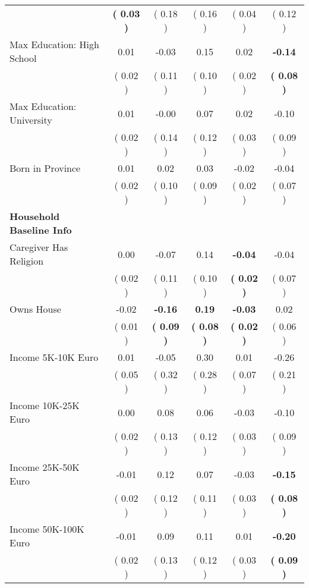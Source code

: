 \begin{table}[H]
{\begin{tabular}{lccccc}
\quad  & \textbf{(     0.03 )} & (     0.18 )  & (     0.16 )  & (     0.04 ) & (     0.12 ) \\
\quad Max Education: High School &      0.01 &     -0.03 &      0.15 &      0.02 & \textbf{    -0.14} \\
\quad  & (     0.02 ) & (     0.11 )  & (     0.10 )  & (     0.02 ) & \textbf{(     0.08 )} \\
\quad Max Education: University &      0.01 &     -0.00 &      0.07 &      0.02 &     -0.10 \\
\quad  & (     0.02 ) & (     0.14 )  & (     0.12 )  & (     0.03 ) & (     0.09 ) \\
\quad Born in Province &      0.01 &      0.02 &      0.03 &     -0.02 &     -0.04 \\
\quad  & (     0.02 ) & (     0.10 )  & (     0.09 )  & (     0.02 ) & (     0.07 ) \\
\midrule
\textbf{Household Baseline Info} \\
\quad Caregiver Has Religion &      0.00 &     -0.07 &      0.14 & \textbf{    -0.04} &     -0.04 \\
\quad  & (     0.02 ) & (     0.11 )  & (     0.10 )  & \textbf{(     0.02 )} & (     0.07 ) \\
\quad Owns House &     -0.02 & \textbf{    -0.16} & \textbf{     0.19} & \textbf{    -0.03} &      0.02 \\
\quad  & (     0.01 ) & \textbf{(     0.09 )}  & \textbf{(     0.08 )}  & \textbf{(     0.02 )} & (     0.06 ) \\
\quad Income 5K-10K Euro &      0.01 &     -0.05 &      0.30 &      0.01 &     -0.26 \\
\quad  & (     0.05 ) & (     0.32 )  & (     0.28 )  & (     0.07 ) & (     0.21 ) \\
\quad Income 10K-25K Euro &      0.00 &      0.08 &      0.06 &     -0.03 &     -0.10 \\
\quad  & (     0.02 ) & (     0.13 )  & (     0.12 )  & (     0.03 ) & (     0.09 ) \\
\quad Income 25K-50K Euro &     -0.01 &      0.12 &      0.07 &     -0.03 & \textbf{    -0.15} \\
\quad  & (     0.02 ) & (     0.12 )  & (     0.11 )  & (     0.03 ) & \textbf{(     0.08 )} \\
\quad Income 50K-100K Euro &     -0.01 &      0.09 &      0.11 &      0.01 & \textbf{    -0.20} \\
\quad  & (     0.02 ) & (     0.13 )  & (     0.12 )  & (     0.03 ) & \textbf{(     0.09 )} \\

\end{tabular}}
\end{table}
